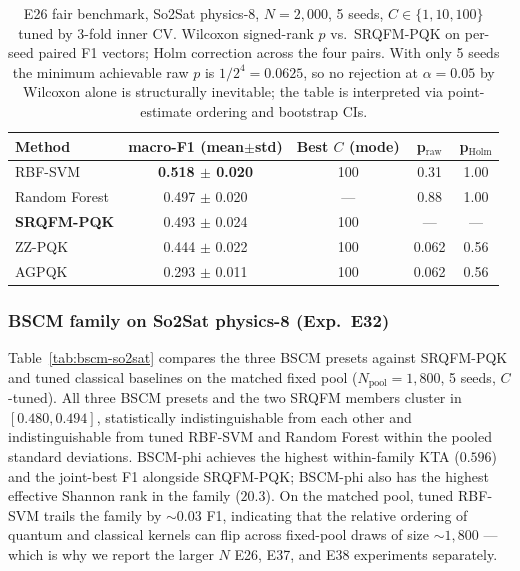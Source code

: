 \documentclass[pdflatex,sn-mathphys-num]{sn-jnl}
\theoremstyle{thmstyleone}
\theoremstyle{thmstyletwo}
\theoremstyle{thmstylethree}
\begin{document}
\begin{table}[htbp]
\caption{E26 fair benchmark, So2Sat physics-8, $N=2{,}000$,
5 seeds, $C\in \{1,10,100\}$ tuned by 3-fold inner CV. Wilcoxon
signed-rank $p$ vs.\ SRQFM-PQK on per-seed paired F1 vectors; Holm
correction across the four pairs.  With only 5 seeds the minimum
achievable raw $p$ is $1/2^{4}=0.0625$, so no rejection at
$\alpha=0.05$ by Wilcoxon alone is structurally inevitable; the
table is interpreted via point-estimate ordering and bootstrap CIs.}
\label{tab:e26}
\begin{tabular}{lcccc}
\toprule
Method & macro-F1 (mean$\pm$std) & Best $C$ (mode) & p$_\text{raw}$ & p$_\text{Holm}$ \\
\midrule
RBF-SVM        & \textbf{0.518 $\pm$ 0.020} & 100  & 0.31  & 1.00 \\
Random Forest  & 0.497 $\pm$ 0.020 & ---  & 0.88  & 1.00 \\
\textbf{SRQFM-PQK} & 0.493 $\pm$ 0.024 & 100  & ---   & ---  \\
ZZ-PQK         & 0.444 $\pm$ 0.022 & 100  & 0.062 & 0.56 \\
AGPQK          & 0.293 $\pm$ 0.011 & 100  & 0.062 & 0.56 \\
\bottomrule
\end{tabular}
\end{table}

\subsubsection{BSCM family on So2Sat physics-8 (Exp.\ E32)}\label{sec:bscm-results}
Table~\ref{tab:bscm-so2sat} compares the three BSCM presets against
SRQFM-PQK and tuned classical baselines on the matched fixed pool
($N_{\text{pool}}=1{,}800$, 5 seeds, $C$-tuned). All three BSCM
presets and the two SRQFM members cluster in $[0.480,0.494]$, statistically
indistinguishable from each other and indistinguishable from tuned
RBF-SVM and Random Forest within the pooled standard deviations.
BSCM-phi achieves the highest within-family KTA ($0.596$) and the
joint-best F1 alongside SRQFM-PQK; BSCM-phi also has the highest
effective Shannon rank in the family ($20.3$). On the matched pool,
tuned RBF-SVM trails the family by $\sim\!0.03$ F1, indicating that
the relative ordering of quantum and classical kernels can flip across
fixed-pool draws of size $\sim\!1{,}800$ --- which is why we report
the larger $N$ E26, E37, and E38 experiments separately.
\end{document}
